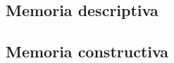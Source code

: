 \subsection{Memoria descriptiva}\label{subsec:memoria-descriptiva}
	
\subsection{Memoria constructiva}\label{subsec:memoria-constructiva}
	
